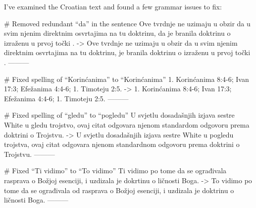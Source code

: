 I've examined the Croatian text and found a few grammar issues to fix:

# Removed redundant “da” in the sentence
Ove tvrdnje ne uzimaju u obzir da u svim njenim direktnim osvrtajima na tu doktrinu, da je branila  doktrinu o  izraženu u prvoj točki .
->
Ove tvrdnje ne uzimaju u obzir da u svim njenim direktnim osvrtajima na tu doktrinu, je branila doktrinu o  izraženu u prvoj točki .
---------

# Fixed spelling of “Korinćanima” to “Korinćanima”
1. Korinćanima 8:4-6; Ivan 17:3; Efežanima 4:4-6; 1. Timoteju 2:5.
->
1. Korinćanima 8:4-6; Ivan 17:3; Efežanima 4:4-6; 1. Timoteju 2:5.
---------

# Fixed spelling of “gledu” to “pogledu”
U svjetlu dosadašnjih izjava sestre White u gledu trojstvo, ovaj citat odgovara njenom standardom odgovoru prema doktrini o Trojstvu.
->
U svjetlu dosadašnjih izjava sestre White u pogledu trojstva, ovaj citat odgovara njenom standardnom odgovoru prema doktrini o Trojstvu.
---------

# Fixed “Ti vidimo” to “To vidimo”
Ti vidimo po tome da se ograđivala rasprava o Božjoj esenciji, i uzdizala je dokrtinu o ličnosti Boga.
->
To vidimo po tome da se ograđivala od rasprava o Božjoj esenciji, i uzdizala je doktrinu o ličnosti Boga.
---------